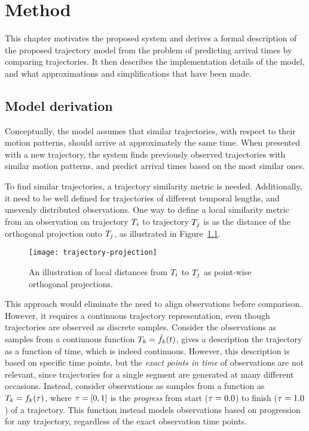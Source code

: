 \chapter{Method}\label{cha:method}
This chapter motivates the proposed system and derives a formal
description of the proposed trajectory model from the problem of
predicting arrival times by comparing trajectories. 
It then describes the implementation details of the model, and what
approximations and simplifications that have been made.

\section{Model derivation}
Conceptually, the model assumes that similar trajectories, with
respect to their motion patterns, should arrive at 
approximately the same time. When presented with a new trajectory, the system
finds previously observed trajectories with similar motion patterns,
and predict arrival times based on the most similar ones. 

To find similar trajectories, a trajectory similarity metric 
is needed. Additionally, it need to be well defined for
trajectories of different temporal lengths, and unevenly
distributed observations. One way to define a local similarity metric from
an observation on trajectory $T_{i}$ to trajectory $T_{j}$ 
is as the distance of the orthogonal
projection onto $T_{j}$, as illustrated in Figure~\ref{fig:trajectory-projection}.
\begin{figure}
  \centering
  \texttt{[image: trajectory-projection]}
  \caption{An illustration of local distances from $T_i$ to
  $T_j$ as point-wise orthogonal projections.}\label{fig:trajectory-projection}
\end{figure}
This approach would eliminate the need to align observations before
comparison. However, it requires a continuous trajectory
representation, even though trajectories are observed as discrete samples.
Consider the observations as samples from a continuous function
$T_{k} = \tilde{f}_{k}(t)$, gives a description the trajectory as a function of
time, which is indeed continuous. However, this description is based on specific time
points, but the \textit{exact points in time} of observations are not
relevant, since trajectories for a single segment are generated at many different
occasions. Instead, consider observations as samples from a function
as $T_{k} = f_{k}(\tau)$, where $\tau = [0, 1]$ 
is the \textit{progress} from start ($\tau = 0.0$) to finish ($\tau = 1.0$) 
of a trajectory. This function instead models observations based on
progression for any trajectory, regardless of the exact observation
time points. 


